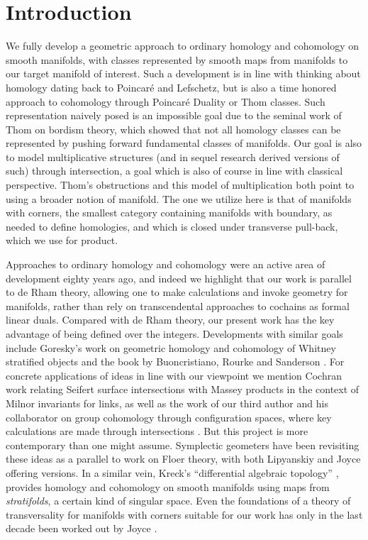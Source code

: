 
\section{Introduction}\label{intro}

We fully develop a geometric approach to ordinary homology and cohomology on smooth manifolds,
with classes represented by smooth maps from manifolds to our target manifold of interest.
Such a development is in line with thinking about homology dating back to Poincar\'e and Lefschetz, but is also a time honored approach to cohomology through Poincar\'e Duality or Thom classes.
Such representation naively posed is an impossible goal due to the seminal work of Thom on bordism theory,
which showed that not all homology classes can be represented by pushing forward fundamental classes of manifolds.
Our goal is also to model multiplicative structures (and in sequel research derived versions of such) through intersection, a goal which is also of course in line with classical perspective.
Thom's obstructions and this model of multiplication both point to using a broader notion of manifold.
The one we utilize here is that of manifolds with corners, the smallest category containing manifolds with boundary, as needed to define homologies, and which is closed under transverse pull-back, which we use for product.

Approaches to ordinary homology and cohomology were an active area of development eighty years ago, and indeed we highlight that our work is parallel to de Rham theory, allowing one to make calculations and invoke geometry for manifolds, rather than rely on transcendental approaches to cochains as formal linear duals.
Compared with de Rham theory, our present work has the key advantage of being defined over the integers.
Developments with similar goals include Goresky's work on geometric homology and cohomology of Whitney stratified objects \cite{goresky1981stratified} and the book by Buoncristiano, Rourke and Sanderson \cite{buoncristiano1976homology}.
For concrete applications of ideas in line with our viewpoint we mention Cochran work \cite{cochran1990milnor} relating Seifert surface intersections with Massey products in the context of Milnor invariants for links, as well as the work of our third author and his collaborator on group cohomology through configuration spaces, where key calculations are made through intersections \cite{giusti2012symmetric, giusti2021alternating}.
But this project is more contemporary than one might assume.
Symplectic geometers have been revisiting these ideas as a parallel to work on Floer theory, with both Lipyanskiy \cite{Lipy14} and Joyce \cite{Joyc15} offering versions.
In a similar vein, Kreck's ``differential algebraic topology'' \cite{Krec10}, provides homology and cohomology on smooth manifolds using maps from \textit{stratifolds}, a certain kind of singular space.
Even the foundations of a theory of transversality for manifolds with corners suitable for our work
has only in the last decade been worked out by Joyce \cite{Joy12}.

